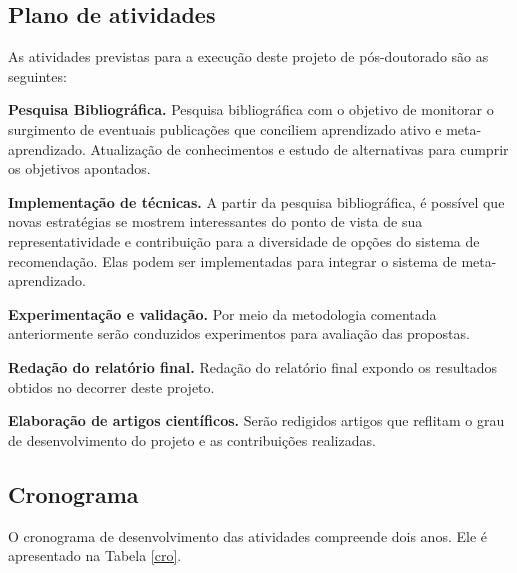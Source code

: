 \subsection{Plano de atividades}
As atividades previstas para a execução deste projeto de pós-doutorado são as seguintes:

\begin{compactenum}

\item{\textbf{Pesquisa Bibliográfica.} Pesquisa bibliográfica com o objetivo de
monitorar o surgimento de eventuais publicações que conciliem aprendizado ativo e meta-aprendizado. Atualização de conhecimentos e estudo de alternativas para cumprir os objetivos apontados.}

\item{\textbf{Implementação de técnicas.} A partir da pesquisa bibliográfica, é possível que novas estratégias se mostrem interessantes do ponto de 
vista de sua representatividade e contribuição para a diversidade de opções
do sistema de recomendação. Elas podem ser implementadas para integrar o sistema de meta-aprendizado.}

\item{\textbf{Experimentação e validação.} Por meio da metodologia comentada anteriormente serão conduzidos experimentos para avaliação das propostas.}

\item {\textbf{Redação do relatório final.} Redação do relatório final expondo os resultados obtidos no decorrer deste projeto.}

\item{\textbf{Elaboração de artigos científicos.} Serão redigidos artigos que reflitam o grau de desenvolvimento do projeto e as contribuições realizadas.}
\end{compactenum}

\subsection{Cronograma}\label{ssec:Cronograma}
O cronograma de desenvolvimento das atividades compreende dois anos.
Ele é apresentado na Tabela \ref{cro}.

\newcommand{\y}{\rule{13pt}{5pt}}
\newcommand{\x}{\hspace*{4pt}}
\setlength{\tabcolsep}{0pt}

